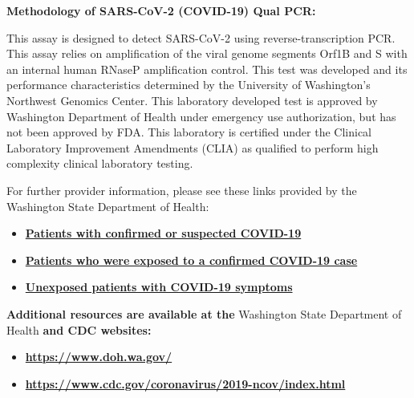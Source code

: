 \documentclass[12pt]{article}
\begin{document}
\textbf{Methodology of SARS-CoV-2 (COVID-19) Qual PCR:}

This assay is designed to detect SARS-CoV-2 using reverse-transcription
PCR. This assay relies on amplification of the viral genome segments
Orf1B and S with an internal human RNaseP amplification control. This
test was developed and its performance characteristics determined by the
University of Washington's Northwest Genomics Center. This laboratory
developed test is approved by Washington Department of Health under
emergency use authorization, but has not been approved by FDA. This
laboratory is certified under the Clinical Laboratory Improvement
Amendments (CLIA) as qualified to perform high complexity clinical
laboratory testing.

For further provider information, please see these links provided by the
Washington State Department of Health:

\begin{itemize}
\item

  \href{https://www.doh.wa.gov/Portals/1/Documents/1600/coronavirus/COVIDcasepositive.pdf}{\textbf{{Patients
  with confirmed or suspected COVID-19}}}

\item

  \href{https://www.doh.wa.gov/Portals/1/Documents/1600/coronavirus/COVIDexposed.pdf}{\textbf{{Patients
  who were exposed to a confirmed COVID-19 case}}}

\item

  \href{https://www.doh.wa.gov/Portals/1/Documents/1600/coronavirus/COVIDconcerned.pdf}{\textbf{{Unexposed
  patients with COVID-19 symptoms}}}

\end{itemize}

\textbf{Additional resources are available at the} Washington State
Department of Health \textbf{and CDC websites: }

\begin{itemize}
\item

  \href{https://www.doh.wa.gov}{\textbf{{https://www.doh.wa.gov/}}}

\item

  \href{https://www.cdc.gov/coronavirus/2019-ncov/index.html}{\textbf{{https://www.cdc.gov/coronavirus/2019-ncov/index.html}}}

\end{itemize}
\end{document}
